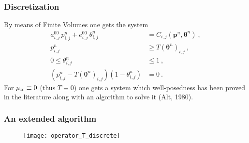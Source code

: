 \documentclass[10pt,aspectratio=169]{beamer}
\begin{document}
\begin{frame}
\frametitle{Discretization}
By means of Finite Volumes one gets the system
\begin{align*}
a^{00}_{i,j}\,p^n_{i,j}+e^{00}_{i,j}\,\theta^n_{i,j} &= C_{i,j}(\bm{p}^n,\bm{\theta}^n)~,\\
p_{i,j}^n&\geq T\left(\bm{\theta}^n\right)_{i,j}~,\\
0\leq \theta_{i,j}^n&\leq 1~,\\
\left(p_{i,j}^n-T\left(\bm{\theta}^n\right)_{i,j}\right)\left(1-\theta_{i,j}^n\right)&=0~.
\end{align*}
For $p_{\textnormal{\scriptsize{cc}}}\equiv 0$ (thus $T\equiv 0$) one gets a system which well-posedness has been proved in the literature along with an algorithm to solve it (Alt, 1980). 
\end{frame}

\begin{frame}\frametitle{An extended algorithm}\vspace*{0.7cm}\hspace*{-0.5cm}
	\begin{minipage}[c]{0.6\linewidth}\footnotesize 
		\begin{algorithm}[H]

		\end{algorithm}
	\end{minipage}
	\begin{minipage}{0.35\linewidth}
		 \begin{figure}
		 	\centering
		 	\texttt{[image: operator\_T\_discrete]}
		 \end{figure}
\end{minipage}
\end{frame}
\end{document}
